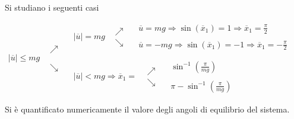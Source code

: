 Si studiano i seguenti casi
$$|\overline{u}| \leq mg
\begin{aligned}
&\nearrow \\
& \\
&\\
&\searrow
\end{aligned}\
\begin{aligned}
&\\
&\\
&|\overline{u}|=mg \begin{aligned}
&\nearrow \\
&\searrow
\end{aligned}\ \begin{aligned}
&\overline{u} = mg \Rightarrow\sin(\overline{x}_1) = 1 \Rightarrow
\overline{x}_1 = \frac{\pi}{2}\\
&\\
&\overline{u} = -mg \Rightarrow \sin(\overline{x}_1) = -1 \Rightarrow
\overline{x}_1 = -\frac{\pi}{2}
\end{aligned}
&\\
&\\
&|\overline{u}|<mg \Rightarrow \overline{x}_1 = \begin{aligned}
&\nearrow \\
& \searrow
\end{aligned}\ \begin{aligned}
&\sin^{-1}\left(\frac{\pi}{mg}\right) \\
&\\
&\pi - \sin^{-1}\left(\frac{\pi}{mg}\right)
\end{aligned}
\\
&\\
\end{aligned}
$$
Si è quantificato numericamente il valore degli angoli di equilibrio del
sistema.
